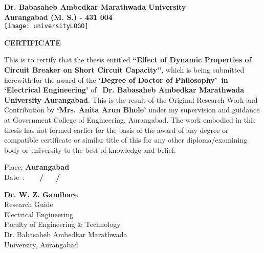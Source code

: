 \clearpage


\begin{center}
\large \textbf{Dr. Babasaheb Ambedkar Marathwada University\\
Aurangabad (M. S.) - 431 004}\\
\vspace{0.5cm}
\texttt{[image: universityLOGO]}\\
\vspace{0.5cm}


\textbf{\large CERTIFICATE}\\
\end{center}
\normalsize This is to certify that the thesis entitled \textbf{\textquotedblleft Effect of Dynamic Properties of Circuit Breaker on Short Circuit Capacity\textquotedblright}, which is being submitted herewith for the award of the \textbf{\textquoteleft Degree of Doctor of Philosophy\textquoteright ~in \textquoteleft Electrical Engineering\textquoteright} of~ \textbf{Dr. Babasaheb Ambedkar Marathwada University Aurangabad}. This is the result of the Original Research Work and Contribution by \textbf{\textquoteleft Mrs. Anita Arun Bhole\textquoteright} under my supervision and guidance at Government College of Engineering, Aurangabad. The work embodied in this thesis has not formed earlier for the basis of the award of any degree or compatible certificate or similar title of this for any other diploma/examining body or university to the best of knowledge and belief. 

\vspace{0.5cm}
Place: \textbf{Aurangabad}\\
Date~: \textbf{~~~/~~~/}\\

\hspace{2.2in}
\begin{minipage}{4in}
\vspace{0.5in}
\begin{center}
\textbf{Dr. W. Z. Gandhare}\\
Research Guide\\
Electrical Engineering\\
Faculty of Engineering \& Technology\\
Dr. Babasaheb Ambedkar Marathwada\\University, Aurangabad\\
\end{center}
\end{minipage}

